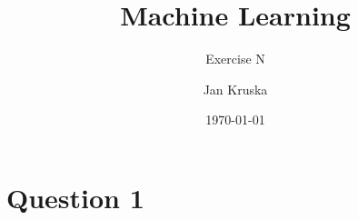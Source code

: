 \documentclass{scrartcl}
\begin{document}
	
	\title{Machine Learning}
	\subtitle{Exercise N}
	\author{Jan Kruska}
	\date{\today}
	
	\maketitle
	
	\section*{Question 1}
	
\end{document}
